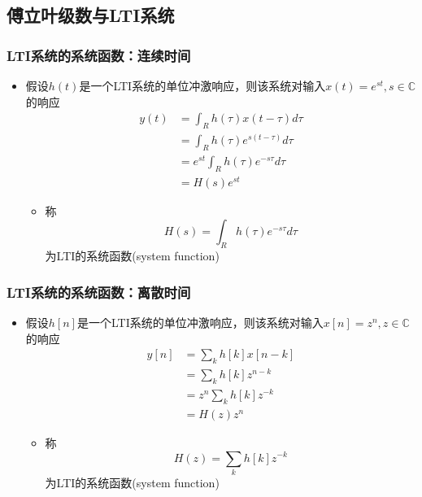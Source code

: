 \documentclass[CJKutf8,xcolor=pdftex,dvipsnames,table]{beamer}
\begin{document}
\begin{CJK*}{UTF8}{song}
  \section{傅立叶级数与LTI系统}
  
  \begin{frame}
    \frametitle{LTI系统的系统函数：连续时间}
    \begin{itemize}
    \item 假设$h(t)$是一个LTI系统的单位冲激响应，则该系统对输入$x(t)=e^{st}, s \in \mathbb{C}$的响应
    	\begin{align*}
 		y(t) & = \int_R h(\tau)x(t - \tau )d\tau \\
		& = \int_R h(\tau )e^{s(t-\tau )}d\tau    \\
		& = e^{st} \int_R h(\tau)e^{-s\tau}d\tau \\
		& = H(s)e^{st}
    	\end{align*}   
		\begin{itemize}
		\item 称\[ H(s) = \int_R h(\tau)e^{-s\tau}d\tau \] 为LTI的系统函数(system function)
		\end{itemize}
    \end{itemize}
  \end{frame}  
     
  \begin{frame}
    \frametitle{LTI系统的系统函数：离散时间}
    \begin{itemize}
    \item 假设$h[n]$是一个LTI系统的单位冲激响应，则该系统对输入$x[n]=z^{n}, z \in \mathbb{C}$的响应
    	\begin{align*}
 		y[n] & = \sum_k h[k]x[n-k] \\
		& = \sum_k h[k]z^{n-k}    \\
		& = z^{n} \sum_k h[k]z^{-k} \\
		& = H(z)z^{n}
    	\end{align*}   
		\begin{itemize}
		\item 称\[ H(z) = \sum_k h[k]z^{-k} \] 为LTI的系统函数(system function)
		\end{itemize}
    \end{itemize}
  \end{frame} 
          

\end{CJK*}
\end{document}
